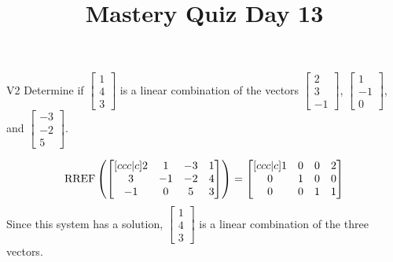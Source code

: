 \documentclass{sbgLAquiz}
\title{Mastery Quiz Day 13 }
\begin{document}
\begin{problem}{V2}
Determine if $\begin{bmatrix} 1 \\ 4 \\ 3 \end{bmatrix}$ is a linear combination of the vectors $\begin{bmatrix} 2 \\ 3 \\ -1 \end{bmatrix}$, $\begin{bmatrix} 1 \\ -1 \\ 0 \end{bmatrix}$, and $\begin{bmatrix} -3 \\ -2 \\ 5 \end{bmatrix}$.
\end{problem}
\begin{solution}
$$\operatorname{RREF}\left( \begin{bmatrix}[ccc|c] 2 & 1 & -3  & 1 \\ 3 & -1 & -2 & 4 \\ -1 & 0 & 5 & 3 \end{bmatrix} \right) = \begin{bmatrix}[ccc|c] 1 & 0 & 0 & 2 \\ 0 & 1 & 0 & 0 \\ 0 & 0 &  1 & 1 \end{bmatrix}$$
Since this system has a solution,  $\begin{bmatrix} 1 \\ 4 \\ 3 \end{bmatrix}$ is a linear combination of the three vectors.
\end{solution}
\end{document}
